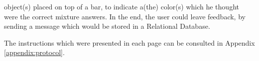 object(s) placed on top of a bar, to indicate a(the) color(s) which he thought were the correct mixture answers. In the end, the user could leave
feedback, by sending a message which would be stored in a Relational Database. \par
%
The instructions which were presented in each page can be consulted in Appendix \ref{appendix:protocol}. \par
%
